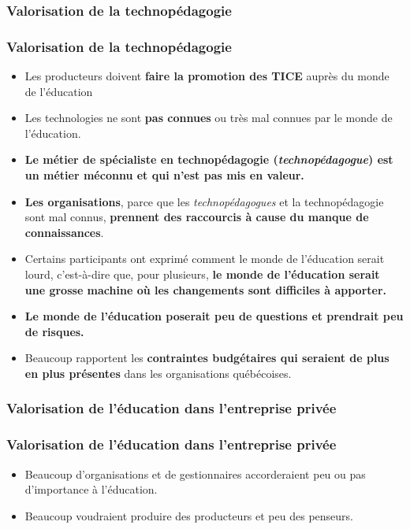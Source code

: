 				\subsubsection{Valorisation de la technopédagogie} 
						\begin{frame}[allowframebreaks]
						\frametitle{Valorisation de la technopédagogie}
                        			
                        			\begin{itemize}
                        			\item Les producteurs doivent \textbf{faire la promotion des TICE} auprès du monde de l’éducation
                        			\item Les technologies ne sont \textbf{pas connues} ou très mal connues par le monde de l’éducation. 
                        			\item \textbf{Le métier de spécialiste en technopédagogie (\textit{technopédagogue}) est un métier méconnu et qui n’est pas mis en valeur. }
                        			\item \textbf{Les organisations}, parce que les \textit{technopédagogues} et la technopédagogie sont mal connus, \textbf{prennent des raccourcis à cause du manque de connaissances}. 
                        			\item Certains participants ont exprimé comment le monde de l’éducation serait lourd, c’est-à-dire que, pour plusieurs, \textbf{le monde de l’éducation serait une grosse machine où les changements sont difficiles à apporter. }
                        			\item \textbf{Le monde de l’éducation poserait peu de questions et prendrait peu de risques.} 
                        			\item Beaucoup rapportent les \textbf{contraintes budgétaires qui seraient de plus en plus présentes} dans les organisations québécoises. 
						\end{itemize}
						
						\end{frame}	
						
					\subsubsection{Valorisation de l'éducation dans l'entreprise privée} 
						\begin{frame}[allowframebreaks]
						\frametitle{Valorisation de l'éducation dans l'entreprise privée}
                        			
                        			\begin{itemize}
                        			\item Beaucoup d’organisations et de gestionnaires accorderaient peu ou pas d’importance à l’éducation. 
                        			\item Beaucoup voudraient produire des producteurs et peu des penseurs. 
                        			
						\end{itemize}
						\end{frame}	
						
